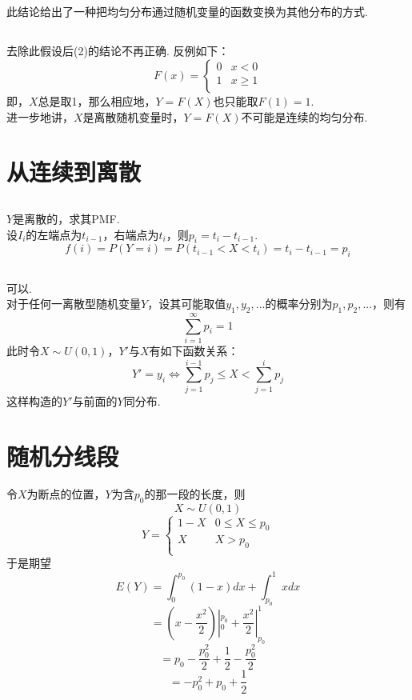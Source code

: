 \documentclass{article}
\begin{document}
\begin{CJK}{UTF8}{gbsn}
\subsection{}
此结论给出了一种把均匀分布通过随机变量的函数变换为其他分布的方式.
\subsection{}
去除此假设后(2)的结论不再正确. 反例如下：
\begin{equation}
    F(x)=\left\{
    \begin{array}{cl}
    0 & x<0\\
    1 & x\geq 1\\
    \end{array}\right.
\end{equation}
即，$X$总是取1，那么相应地，$Y=F(X)$也只能取$F(1)=1$.
\\进一步地讲，$X$是离散随机变量时，$Y=F(X)$不可能是连续的均匀分布.
\section{从连续到离散}
\subsection{}
$Y$是离散的，求其PMF.
\\设$I_{i}$的左端点为$t_{i-1}$，右端点为$t_{i}$，则$p_{i}=t_{i}-t_{i-1}$.
$$ f(i)=P(Y=i)=P(t_{i-1}<X<t_{i})=t_{i}-t_{i-1}=p_{i}$$
\subsection{}
可以.
\\对于任何一离散型随机变量$Y$，设其可能取值$y_{1},y_{2},...$的概率分别为$p_{1},p_{2},...$，则有
$$\sum\limits_{i=1}^{\infty}p_{i}=1$$
此时令$X\sim U(0,1)$，$Y'$与$X$有如下函数关系：
$$ Y'=y_{i}\iff \sum\limits_{j=1}^{i-1}p_{j}\leq X<\sum\limits_{j=1}^{i}p_{j}$$
这样构造的$Y'$与前面的$Y$同分布.
\section{随机分线段}
令$X$为断点的位置，$Y$为含$p_{0}$的那一段的长度，则
$$ X\sim U(0,1)$$
\begin{equation}
    Y=\left\{
    \begin{array}{cl}
    1-X & 0\leq X\leq p_{0}\\
    X & X>p_{0}\\
    \end{array}\right.
\end{equation}
于是期望
$$ E(Y)=\int_{0}^{p_{0}}(1-x)dx+\int_{p_{0}}^{1}xdx$$
$$ =(x-\frac{x^{2}}{2})|_{0}^{p_{0}}+\frac{x^{2}}{2}|_{p_{0}}^{1}$$
$$ =p_{0}-\frac{p_{0}^{2}}{2}+\frac{1}{2}-\frac{p_{0}^{2}}{2}$$
$$ =-p_{0}^{2}+p_{0}+\frac{1}{2}$$

\end{CJK}
\end{document}

